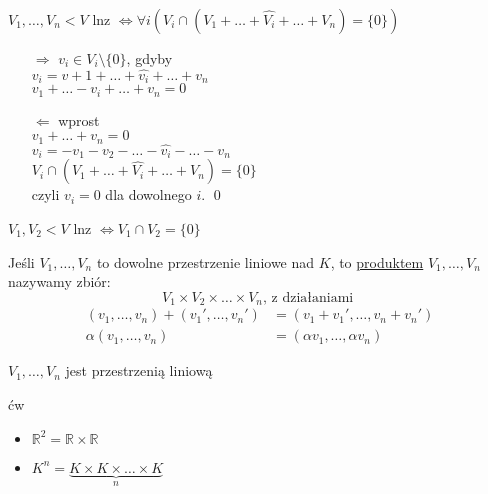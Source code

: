 \begin{lem}
    $V_1,\ldots,V_n < V$ lnz $\Leftrightarrow \forall i (V_i \cap (V_1+\ldots+\widehat{V_i} + \ldots + V_n) = \{0\})$
    \begin{dd} \hfill 
        \begin{itemize} 
            \item[$\Rightarrow$] $v_i \in V_i \setminus \{0\}$, gdyby \\ 
                $v_i = v+1 + \ldots + \widehat{v_i} + \ldots + v_n$ \\ 
                $v_1 + \ldots - v_i + \ldots + v_n = 0$ \hfill \lightning
            \item[$\Leftarrow$] wprost \\ 
                $v_1 + \ldots + v_n = 0$ \\ 
                $v_i = -v_1 - v_2 - \ldots - \widehat{v_i} - \ldots - v_n$ \\ 
                $V_i \cap (V_1 + \ldots + \widehat{V_i}+ \ldots + V_n) = \{0\}$ \\ 
                czyli $v_i = 0 $ dla dowolnego $i$. \hfill \qed
        \end{itemize}
    \end{dd} 
\end{lem}
\begin{wn} 
    $V_1,V_2 < V$ lnz $\Leftrightarrow V_1 \cap V_2 = \{0\}$
\end{wn} 
\begin{df}[nobreak = true]
    Jeśli $V_1,\ldots,V_n$ to dowolne przestrzenie liniowe nad $K$, to \underline{produktem} $V_1,\ldots,V_n$ 
    nazywamy zbiór: 
        \[ V_1 \times V_2 \times \ldots \times V_n \text{, z działaniami }\] 
     \begin{align*} 
        (v_1,\ldots,v_n)+(v_1',\ldots,v_n') &= (v_1 + v_1',\ldots,v_n+v_n') \\ 
        \alpha (v_1,\ldots,v_n) &= (\alpha v_1,\ldots,\alpha v_n)
    \end{align*}
\end{df} 
\begin{ft} 
    $V_1,\ldots,V_n$ jest przestrzenią liniową
\end{ft} 
\begin{dd} 
    ćw 
\end{dd} 
\begin{przy} \hfill 
    \begin{itemize} 
        \item $\mathbb R^2 = \mathbb R \times \mathbb R$
        \item $K^n = \underbrace{K \times K \times \ldots \times K}_{n}$
    \end{itemize} 
\end{przy} 

